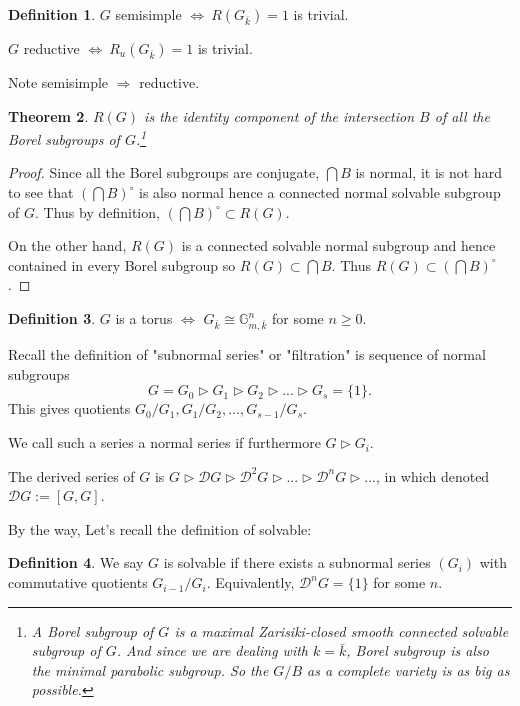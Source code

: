 \documentclass[12pt,a4paper,english]{article}
\theoremstyle{plain}
\newtheorem{thm}{Theorem}[section]
\theoremstyle{definition}
\newtheorem{defi}[thm]{Definition}
\begin{document}
\begin{defi}
$G$ semisimple $\Leftrightarrow\ R(G_{\bar{k}})=1$ is trivial.

$G$ reductive $\Leftrightarrow\ R_{u}(G_{\bar{k}})=1$ is trivial.

Note semisimple $\Rightarrow$ reductive.
\end{defi}
\begin{thm}
$R(G)$ is the identity component of the intersection $B$ of all the Borel subgroups of $G$.\footnote{A Borel subgroup of $G$ is a maximal Zarisiki-closed smooth connected solvable subgroup of $G$. And since we are dealing with $k=\bar{k}$, Borel subgroup is also the minimal parabolic subgroup. So the $G/B$ as a complete variety is as big as possible.}
\end{thm}
\begin{proof}
Since all the Borel subgroups are conjugate, $\bigcap B$ is normal, it is not hard to see that $(\bigcap B)^{\circ}$ is also normal hence a connected normal solvable subgroup of $G$. Thus by definition, $(\bigcap B)^{\circ}\subset R(G)$.

On the other hand, $R(G)$ is a connected solvable normal subgroup and hence contained in every Borel subgroup so $R(G)\subset \bigcap B$. Thus $R(G)\subset (\bigcap B)^{\circ}$.
\end{proof}
\begin{defi}
$G$ is a torus $\Leftrightarrow$ $G_{\bar{k}}\cong \mathbb{G}^{n}_{m,\bar{k}}$ for some $n\geq 0$.
\end{defi}


Recall the definition of "subnormal series" or "filtration" is sequence of normal subgroups
\begin{equation*}
    G=G_{0}\vartriangleright G_{1}\vartriangleright G_{2}\vartriangleright...\vartriangleright G_{s}=\{1\}.
\end{equation*}
This gives quotients $G_{0}/G_{1}, G_{1}/G_{2},...,G_{s-1}/G_{s}$.

We call such a series a normal series if furthermore $G\vartriangleright G_{i}$.

The derived series of $G$ is $G\vartriangleright\mathcal{D}G\vartriangleright\mathcal{D}^{2}G\vartriangleright...\vartriangleright\mathcal{D}^{n}G\vartriangleright...$, in which denoted $\mathcal{D}G:=[G,G]$.

By the way, Let's recall the definition of solvable:
\begin{defi}
We say $G$ is solvable if there exists a subnormal series $(G_{i})$ with commutative quotients $G_{i-1}/G_{i}$. Equivalently, $\mathcal{D}^{n}G=\{1\}$ for some $n$.
\end{defi}
\end{document}
